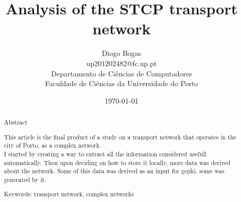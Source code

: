 \documentclass[12pt]{article}
\title{Analysis of the STCP transport network}
\author{Diogo Bogas \\ 
        up201202482@fc.up.pt \\ 
        Departamento de Ciências de Computadores\\
        Faculdade de Ciências da Universidade do Porto\\
        }
\date{\today}
\begin{document}
\maketitle
{}

\begin{abstract}



\begin{center}
Abstract\\
\end{center}

This article is the final product of a study on a transport network that operates in the city of Porto, as a complex network.\\ 
I started by creating a way to extract all the information considered usefull automatically. Then upon deciding on how to store it locally, more data was derived about the network. Some of this data was derived as an input for gephi, some was generated by it.


Keywords: transport network, complex networks

\end{abstract}
\end{document}
